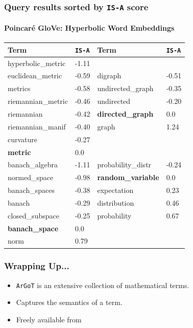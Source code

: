 \documentclass{beamer}
\newcommand{\argot}{\texttt{ArGoT}\xspace}
\newcommand{\isa}{\texttt{IS-A}\xspace}
\begin{document}
\begin{frame}
    \frametitle{Query results sorted by \isa score}
    \framesubtitle{Poincaré GloVe: Hyperbolic Word Embeddings}
\begin{table}
    \small
\centering
\begin{tabular}{ll|ll}
    \hline \textbf{Term} &  \isa &  
    \textbf{Term} &  \isa \\ \hline
    hyperbolic\_metric & -1.11 &  &\\
euclidean\_metric & -0.59  & digraph & -0.51 \\
metrics & -0.58 & undirected\_graph & -0.35 \\
riemannian\_metric & -0.46  &  undirected & -0.20 \\
riemannian & -0.42  & \textbf{directed\_graph} &  0.0\\
riemannian\_manif & -0.40 & graph & 1.24 \\
curvature & -0.27  & & \\
\textbf{metric} & 0.0 & & \\
\hline
banach\_algebra & -1.11  & probability\_distr & -0.24 \\
normed\_space & -0.98 & \textbf{random\_variable} & 0.0 \\
banach\_spaces & -0.38 & expectation & 0.23 \\
banach & -0.29  & distribution & 0.46 \\
closed\_subspace & -0.25 & probability & 0.67 \\
\textbf{banach\_space} & 0.0 & & \\
norm & 0.79 & & \\

\end{tabular}
\end{table}
\end{frame}

\begin{frame}
    \frametitle{Wrapping Up...}
    \begin{itemize}
        \item \argot is an extensive collection of mathematical terms.
            \pause
        \item Captures the semantics of a term.
            \pause
        \item Freely available from 
    \end{itemize}
\end{frame}

\begin{frame}
    \maketitle
\end{frame}
\end{document}
